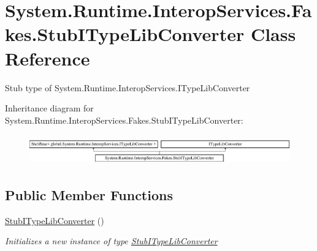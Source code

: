 \hypertarget{class_system_1_1_runtime_1_1_interop_services_1_1_fakes_1_1_stub_i_type_lib_converter}{\section{System.\-Runtime.\-Interop\-Services.\-Fakes.\-Stub\-I\-Type\-Lib\-Converter Class Reference}
\label{class_system_1_1_runtime_1_1_interop_services_1_1_fakes_1_1_stub_i_type_lib_converter}
}


Stub type of System.\-Runtime.\-Interop\-Services.\-I\-Type\-Lib\-Converter 


Inheritance diagram for System.\-Runtime.\-Interop\-Services.\-Fakes.\-Stub\-I\-Type\-Lib\-Converter\-:\begin{figure}[H]
\begin{center}
\leavevmode
\includegraphics[height=1.317647cm]{class_system_1_1_runtime_1_1_interop_services_1_1_fakes_1_1_stub_i_type_lib_converter}
\end{center}
\end{figure}
\subsection*{Public Member Functions}
\begin{DoxyCompactItemize}
\item 
\hyperlink{class_system_1_1_runtime_1_1_interop_services_1_1_fakes_1_1_stub_i_type_lib_converter_a1b8b2df75e9fc7a6ad825247a44482c1}{Stub\-I\-Type\-Lib\-Converter} ()
\begin{DoxyCompactList}\small\item\em Initializes a new instance of type \hyperlink{class_system_1_1_runtime_1_1_interop_services_1_1_fakes_1_1_stub_i_type_lib_converter}{Stub\-I\-Type\-Lib\-Converter}\end{DoxyCompactList}\end{DoxyCompactItemize}
